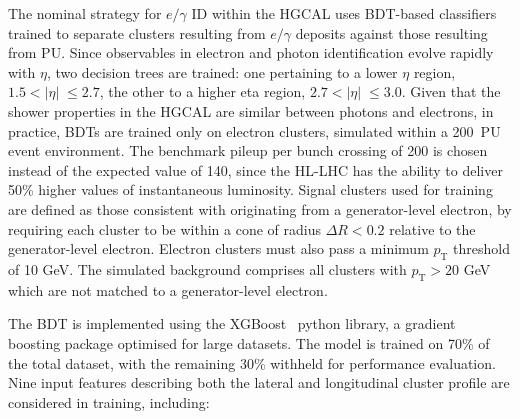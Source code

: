 The nominal strategy for $e/\gamma$ ID within the HGCAL uses BDT-based classifiers trained to separate clusters resulting from $e/\gamma$ deposits against those resulting from PU. Since observables in electron and photon identification evolve rapidly with $\eta$, two decision trees are trained: one pertaining to a lower $\eta$ region, $1.5 < |\eta|\; \leq 2.7$, the other to a higher eta region, $2.7 < |\eta|\; \leq 3.0$. Given that the shower properties in the HGCAL are similar between photons and electrons, in practice, BDTs are trained only on electron clusters, simulated within a 200~PU event environment. The benchmark pileup per bunch crossing of 200 is chosen instead of the expected value of 140, since the HL-LHC has the ability to deliver 50\% higher values of instantaneous luminosity. %
Signal clusters used for training are defined as those consistent with originating from a generator-level electron, by requiring each cluster to be within a cone of radius $\Delta R < 0.2$ relative to the generator-level electron. Electron clusters must also pass a minimum $p_{\mathrm{T}}$ threshold of 10 GeV. The simulated background comprises all clusters with $p_{\mathrm{T}} > 20$ GeV which are not matched to a generator-level electron. 

The BDT is implemented using the XGBoost~\cite{xgboost} python library, a gradient boosting package optimised for large datasets. The model is trained on 70\% of the total dataset, with the remaining 30\% withheld for performance evaluation. Nine input features describing both the lateral and longitudinal cluster profile are considered in training, including:

